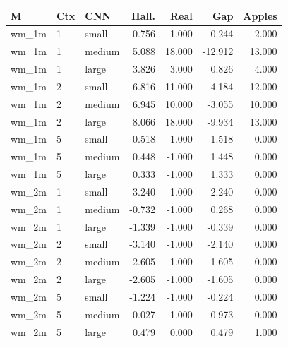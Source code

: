 \begin{tabular}{lllrrrr}
\toprule
M & Ctx & CNN & Hall. & Real & Gap & Apples \\
\midrule
wm\_1m & 1 & small & 0.756 & 1.000 & -0.244 & 2.000 \\
wm\_1m & 1 & medium & 5.088 & 18.000 & -12.912 & 13.000 \\
wm\_1m & 1 & large & 3.826 & 3.000 & 0.826 & 4.000 \\
wm\_1m & 2 & small & 6.816 & 11.000 & -4.184 & 12.000 \\
wm\_1m & 2 & medium & 6.945 & 10.000 & -3.055 & 10.000 \\
wm\_1m & 2 & large & 8.066 & 18.000 & -9.934 & 13.000 \\
wm\_1m & 5 & small & 0.518 & -1.000 & 1.518 & 0.000 \\
wm\_1m & 5 & medium & 0.448 & -1.000 & 1.448 & 0.000 \\
wm\_1m & 5 & large & 0.333 & -1.000 & 1.333 & 0.000 \\
wm\_2m & 1 & small & -3.240 & -1.000 & -2.240 & 0.000 \\
wm\_2m & 1 & medium & -0.732 & -1.000 & 0.268 & 0.000 \\
wm\_2m & 1 & large & -1.339 & -1.000 & -0.339 & 0.000 \\
wm\_2m & 2 & small & -3.140 & -1.000 & -2.140 & 0.000 \\
wm\_2m & 2 & medium & -2.605 & -1.000 & -1.605 & 0.000 \\
wm\_2m & 2 & large & -2.605 & -1.000 & -1.605 & 0.000 \\
wm\_2m & 5 & small & -1.224 & -1.000 & -0.224 & 0.000 \\
wm\_2m & 5 & medium & -0.027 & -1.000 & 0.973 & 0.000 \\
wm\_2m & 5 & large & 0.479 & 0.000 & 0.479 & 1.000 \\
\bottomrule
\end{tabular}
